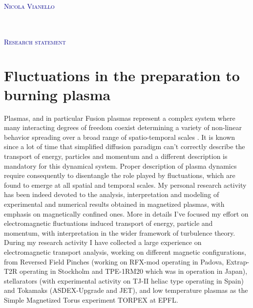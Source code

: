 \documentclass[12pt,a4paper]{article}
\begin{document}
\begin{flushright}
\textcolor{darkBlue}{ \Huge
\lettrine[lines=3,findent=-1pt, loversize = -0.42,
lraise=0.6]{N}{icola Vianello}}\\[2pt]
\textcolor{Gray}{}\\
\textcolor{Gray}{}\\
\textcolor{Gray}{}
\end{flushright}
\begin{flushleft} 
\textcolor{darkBlue}{ \Huge
\lettrine[lines=2,findent=-1pt, loversize = -0.42,
lraise=0.6]{R}{esearch statement}} 
\end{flushleft}


\section*{Fluctuations in the preparation to burning plasma}
Plasmas, and in particular Fusion plasmas represent a complex system
where many interacting degrees of freedom coexist determining a
variety of non-linear behavior spreading over a broad range of
spatio-temporal scales
\cite{Kadomtsev:1992us,Sornette:2006dt}. It is known since a lot of
time that simplified diffusion paradigm can't correctly describe the
transport of energy, particles and momentum and a different
description is mandatory for this dynamical system. Proper description of plasma
dynamics require consequently to disentangle the role played by
fluctuations, which are found to emerge at all spatial and temporal
scales. My personal research activity has been indeed devoted to the analysis,
interpretation and modeling of experimental and numerical results
obtained in magnetized plasmas, with emphasis
on magnetically confined ones. More in details I've focused my effort
on electromagnetic fluctuations induced transport of energy, particle
and momentum, with interpretation in the wider framework of turbulence
theory. During my research activity I have collected a large
experience on electromagnetic transport analysis, working on different
magnetic configurations, from Reversed Field Pinches (working on
RFX-mod operating in Padova, Extrap-T2R operating in Stockholm and
TPE-1RM20 which was in operation in Japan), stellarators (with
experimental activity on TJ-II heliac type operating in Spain) and Tokamaks
(ASDEX-Upgrade and JET), and low temperature plasmas as the Simple
Magnetized Torus experiment TORPEX at EPFL. 
\end{document}
